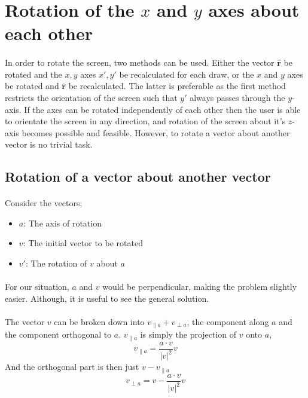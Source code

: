 \documentclass{article}
\newcommand\ru{\hat{\mathbf{r}}\xspace}
\newcommand\proj[2]{\frac{#1 \cdot #2}{\left|#2\right|^2} #2}
\newcommand\xp{x\prime\xspace}
\newcommand\yp{y\prime\xspace}
\newcommand\vp{v\prime\xspace}
\begin{document}
\section{Rotation of the $x$ and $y$ axes about each other}
	\paragraph{}
	In order to rotate the screen, two methods can be used. Either the vector $\ru$ be rotated and the $x, y$ axes $\xp, \yp$ be recalculated for each draw,
	or the $x$ and $y$ axes be rotated and $\ru$ be recalculated. The latter is preferable as the first method restricts the orientation of the screen such that $\yp$ always passes through the $y$-axis.
	If the axes can be rotated independently of each other then the user is able to orientate the screen in any direction, 
	and rotation of the screen about it's $z$-axis becomes possible and feasible. However, to rotate a vector about another vector is no trivial task.
	\subsection{Rotation of a vector about another vector}
	\paragraph{}
	Consider the vectors;
	\begin{itemize}
	\item $a$: The axis of rotation
	\item $v$: The initial vector to be rotated
	\item $\vp$: The rotation of $v$ about $a$
	\end{itemize}
	\paragraph{}
	For our situation, $a$ and $v$ would be perpendicular, making the problem slightly easier. Although, it is useful to see the general solution.
	\paragraph{}
	The vector $v$ can be broken down into $v_{\parallel a} + v_{\perp a}$, the component along $a$ and the component orthogonal to $a$.
	$v_{\parallel a}$ is simply the projection of $v$ onto $a$, 
	$$v_{\parallel a} = \proj{a}{v}$$
	And the orthogonal part is then just $v - v_{\parallel a}$
	$$v_{\perp a} = v - \proj{a}{v}$$
\end{document}
